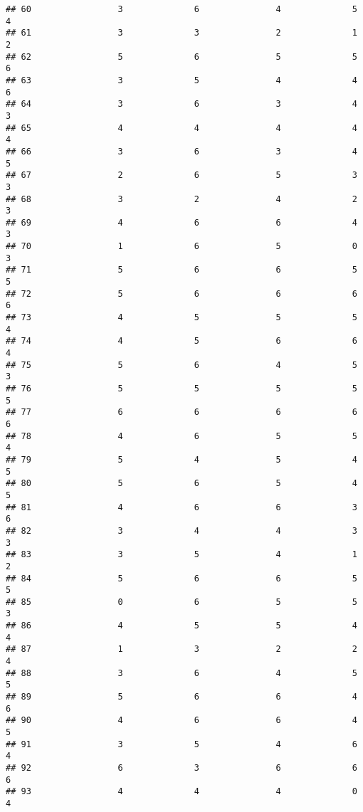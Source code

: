 \documentclass[
]{article}
\begin{document}
\begin{verbatim}
## 60                 3              6               4              5       4
## 61                 3              3               2              1       2
## 62                 5              6               5              5       6
## 63                 3              5               4              4       6
## 64                 3              6               3              4       3
## 65                 4              4               4              4       4
## 66                 3              6               3              4       5
## 67                 2              6               5              3       3
## 68                 3              2               4              2       3
## 69                 4              6               6              4       3
## 70                 1              6               5              0       3
## 71                 5              6               6              5       5
## 72                 5              6               6              6       6
## 73                 4              5               5              5       4
## 74                 4              5               6              6       4
## 75                 5              6               4              5       3
## 76                 5              5               5              5       5
## 77                 6              6               6              6       6
## 78                 4              6               5              5       4
## 79                 5              4               5              4       5
## 80                 5              6               5              4       5
## 81                 4              6               6              3       6
## 82                 3              4               4              3       3
## 83                 3              5               4              1       2
## 84                 5              6               6              5       5
## 85                 0              6               5              5       3
## 86                 4              5               5              4       4
## 87                 1              3               2              2       4
## 88                 3              6               4              5       5
## 89                 5              6               6              4       6
## 90                 4              6               6              4       5
## 91                 3              5               4              6       4
## 92                 6              3               6              6       6
## 93                 4              4               4              0       4

\end{verbatim}
\end{document}
